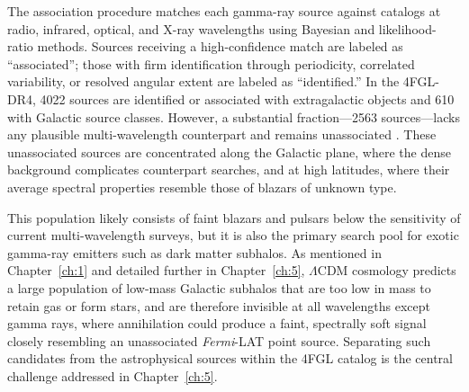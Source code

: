 The association procedure matches each gamma-ray source against catalogs at radio, infrared, optical, and X-ray wavelengths using Bayesian and likelihood-ratio methods.
Sources receiving a high-confidence match are labeled as ``associated''; those with firm identification through periodicity, correlated variability, or resolved angular extent are labeled as ``identified.''
In the 4FGL-DR4, 4022 sources are identified or associated with extragalactic objects and 610 with Galactic source classes.
However, a substantial fraction---2563 sources---lacks any plausible multi-wavelength counterpart and remains unassociated \cite{Ballet:2023qzs}.
These unassociated sources are concentrated along the Galactic plane, where the dense background complicates counterpart searches, and at high latitudes, where their average spectral properties resemble those of blazars of unknown type.

This population likely consists of faint blazars and pulsars below the sensitivity of current multi-wavelength surveys, but it is also the primary search pool for exotic gamma-ray emitters such as dark matter subhalos.
As mentioned in Chapter~\ref{ch:1} and detailed further in Chapter~\ref{ch:5}, $\Lambda$CDM cosmology predicts a large population of low-mass Galactic subhalos that are too low in mass to retain gas or form stars, and are therefore invisible at all wavelengths except gamma rays, where \WIMP annihilation could produce a faint, spectrally soft signal closely resembling an unassociated \textit{Fermi}-LAT point source. Separating such candidates from the astrophysical sources within the 4FGL catalog is the central challenge addressed in Chapter~\ref{ch:5}.
